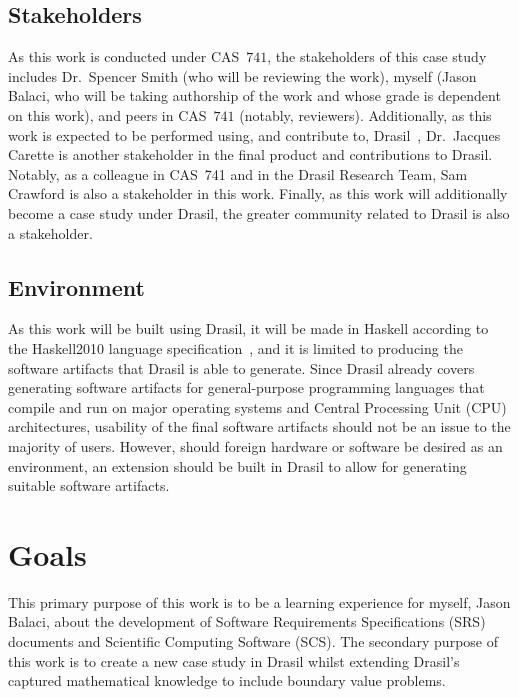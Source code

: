 \documentclass{article}
\begin{document}
\subsection{Stakeholders}
\label{problem-statement:stakeholders}

As this work is conducted under CAS\ $741$, the stakeholders of this case study
includes Dr.\ Spencer Smith (who will be reviewing the work), myself (Jason
Balaci, who will be taking authorship of the work and whose grade is dependent
on this work), and peers in CAS\ $741$ (notably, reviewers). Additionally, as
this work is expected to be performed using, and contribute to, Drasil\
\cite{Drasil2023}, Dr.\ Jacques Carette is another stakeholder in the final
product and contributions to Drasil. Notably, as a colleague in CAS\ 741 and in
the Drasil Research Team, Sam Crawford is also a stakeholder in this work.
Finally, as this work will additionally become a case study under Drasil, the
greater community related to Drasil is also a stakeholder.

\subsection{Environment}
\label{problem-statement:environment}

As this work will be built using Drasil, it will be made in Haskell according to
the Haskell2010 language specification\ \cite{Haskell2010}, and it is limited to
producing the software artifacts that Drasil is able to generate. Since Drasil
already covers generating software artifacts for general-purpose programming
languages that compile and run on major operating systems and Central Processing
Unit (CPU) architectures, usability of the final software artifacts should not
be an issue to the majority of users. However, should foreign hardware or
software be desired as an environment, an extension should be built in Drasil to
allow for generating suitable software artifacts.

\section{Goals}
\label{goals}

This primary purpose of this work is to be a learning experience for myself,
Jason Balaci, about the development of Software Requirements Specifications
(SRS) documents and Scientific Computing Software (SCS). The secondary purpose
of this work is to create a new case study in Drasil whilst extending Drasil's
captured mathematical knowledge to include boundary value problems.
\end{document}
